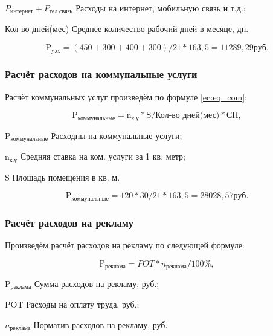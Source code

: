 \begin{eqexpl}[18ex]
    \item{$P_\text{интернет} + P_\text{тел.связь}$} Расходы на интернет, мобильную связь и т.д.;
    \item{Кол-во дней(мес)} Среднее количество рабочий дней в месяце, дн.
\end{eqexpl}

\begin{equation*}
    \text{P}_\text{y.c.} = (450 + 300 + 400 + 300) / 21 * 163,5 = 11289,29 руб.
\end{equation*}

\subsubsection{Расчёт расходов на коммунальные услуги}

Расчёт коммунальных услуг произведём по формуле \ref{ec:eq_com}:

\begin{equation}
    \label{ec:eq_com}
    \text{P}_\text{коммунальные} = \text{n}_\text{к.у} * \text{S} / \text{Кол-во дней(мес)} * \text{СП},
\end{equation}

\begin{eqexpl}[12ex]
    \item{$\text{P}_\text{коммунальные}$} Расходны на коммунальные услуги;
    \item{$\text{n}_\text{к.у}$} Средняя ставка на ком. услуги за 1 кв. метр;
    \item{$\text{S}$} Площадь помещения в кв. м.
\end{eqexpl}

\begin{equation*}
    \text{P}_\text{коммунальные} = 120 * 30 / 21 * 163,5 = 28028,57 \text{руб}.
\end{equation*}

\subsubsection{Расчёт расходов на рекламу}

Произведём расчёт расходов на рекламу по следующей формуле:

\begin{equation}
    \text{P}_\text{реклама} = POT * n_\text{реклама} / 100\%,
\end{equation}

\begin{eqexpl}[7ex]
    \item{$\text{P}_\text{реклама}$} Сумма расходов на рекламу, руб.;
    \item{$\text{POT}$} Расходы на оплату труда, руб.;
    \item{$n_\text{реклама}$} Норматив расходов на рекламу, руб.
\end{eqexpl}

